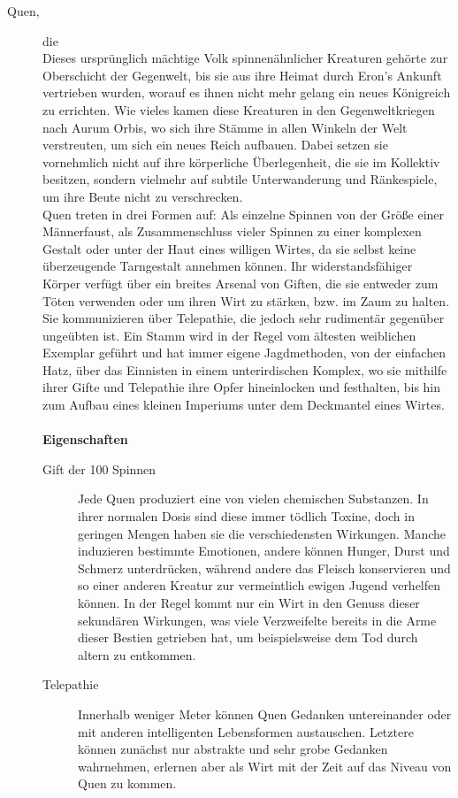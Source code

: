 \documentclass[a4paper,12pt,oneside]{book}
\begin{document}
\begin{description}
\item[Quen,]die
\\Dieses ursprünglich mächtige Volk spinnenähnlicher Kreaturen gehörte zur Oberschicht der Gegenwelt, bis sie aus ihre Heimat durch Eron's Ankunft vertrieben wurden, worauf es ihnen nicht mehr gelang ein neues Königreich zu errichten. Wie vieles kamen diese Kreaturen in den Gegenweltkriegen nach Aurum Orbis, wo sich ihre Stämme in allen Winkeln der Welt verstreuten, um sich ein neues Reich aufbauen. Dabei setzen sie vornehmlich nicht auf ihre körperliche Überlegenheit, die sie im Kollektiv besitzen, sondern vielmehr auf subtile Unterwanderung und Ränkespiele, um ihre Beute nicht zu verschrecken.
\\Quen treten in drei Formen auf: Als einzelne Spinnen von der Größe einer Männerfaust, als Zusammenschluss vieler Spinnen zu einer komplexen Gestalt oder unter der Haut eines willigen Wirtes, da sie selbst keine überzeugende Tarngestalt annehmen können. Ihr widerstandsfähiger Körper verfügt über ein breites Arsenal von Giften, die sie entweder zum Töten verwenden oder um ihren Wirt zu stärken, bzw. im Zaum zu halten. Sie kommunizieren über Telepathie, die jedoch sehr rudimentär gegenüber ungeübten ist. Ein Stamm wird in der Regel vom ältesten weiblichen Exemplar geführt und hat immer eigene Jagdmethoden, von der einfachen Hatz, über das Einnisten in einem unterirdischen Komplex, wo sie mithilfe ihrer Gifte und Telepathie ihre Opfer hineinlocken und festhalten, bis hin zum Aufbau eines kleinen Imperiums unter dem Deckmantel eines Wirtes.
\\\\\textbf{Eigenschaften}
\begin{description}
\item[Gift der 100 Spinnen]Jede Quen produziert eine von vielen chemischen Substanzen. In ihrer normalen Dosis sind diese immer tödlich Toxine, doch in geringen Mengen haben sie die verschiedensten Wirkungen. Manche induzieren bestimmte Emotionen, andere können Hunger, Durst und Schmerz unterdrücken, während andere das Fleisch konservieren und so einer anderen Kreatur zur vermeintlich ewigen Jugend verhelfen können. In der Regel kommt nur ein Wirt in den Genuss dieser sekundären Wirkungen, was viele Verzweifelte bereits in die Arme dieser Bestien getrieben hat, um beispielsweise dem Tod durch altern zu entkommen.
\item[Telepathie]Innerhalb weniger Meter können Quen Gedanken untereinander oder mit anderen intelligenten Lebensformen austauschen. Letztere können zunächst nur abstrakte und sehr grobe Gedanken wahrnehmen, erlernen aber als Wirt mit der Zeit auf das Niveau von Quen zu kommen. 

\end{description}
\end{description}
\end{document}
